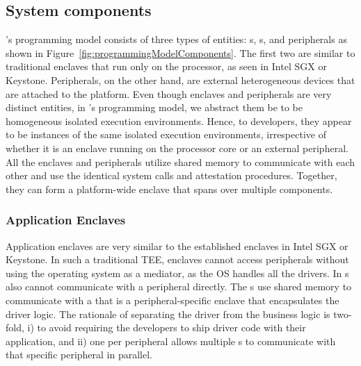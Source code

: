 \subsection{System components}
\label{sec:programmingModel:systemComponents}

\name's programming model consists of three types of entities: \app{}s, \ce{}s, and peripherals as shown in Figure~\ref{fig:programmingModelComponents}. The first two are similar to traditional enclaves that run only on the processor, as seen in Intel SGX or Keystone. Peripherals, on the other hand, are external heterogeneous devices that are attached to the platform. Even though enclaves and peripherals are very distinct entities, in \name's programming model, we abstract them be to be homogeneous isolated execution environments. Hence, to developers, they appear to be instances of the same isolated execution environments, irrespective of whether it is an enclave running on the processor core or an external peripheral. All the enclaves and peripherals utilize shared memory to communicate with each other and use the identical system calls and attestation procedures. Together, they can form a platform-wide enclave that spans over multiple components.


\subsubsection{Application Enclaves} 
\label{sec:programmingModel:systemComponents:ae}

Application enclaves are very similar to the established enclaves in Intel SGX or Keystone. In such a traditional TEE, enclaves cannot access peripherals without using the operating system as a mediator, as the OS handles all the drivers. In \name \app{}s also cannot communicate with a peripheral directly. The \app{}s use shared memory to communicate with a \ce that is a peripheral-specific enclave that encapsulates the driver logic. The rationale of separating the driver from the business logic is two-fold, i) to avoid requiring the developers to ship driver code with their application, and ii) one \ce per peripheral allows multiple \app{}s to communicate with that specific peripheral in parallel. %


